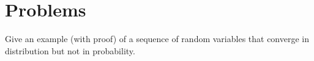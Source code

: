 %

\section{Problems}

\begin{problem}\label{prb:dlim_not_plim}
Give an example (with proof) of a sequence of random variables that converge in distribution but not in probability.
\end{problem}




